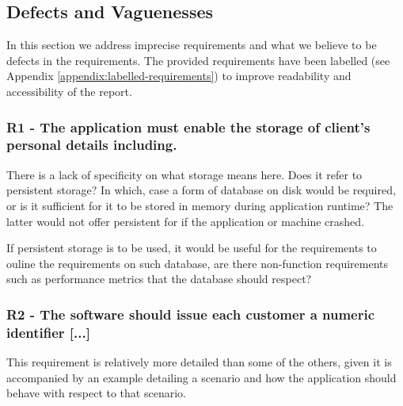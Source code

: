 \par


\subsection{Defects and Vaguenesses}

In this section we address imprecise requirements and what we believe to be defects in the requirements. The provided requirements have been labelled (see Appendix \ref{appendix:labelled-requirements}) to improve readability and accessibility of the report. 

\subsubsection{R1 - The application must enable the storage of client’s personal details including. }

There is a lack of specificity on what storage means here. Does it refer to persistent storage? In which, case a form of database on disk would be required, or is it sufficient for it to be stored in memory during application runtime? The latter would not offer persistent for if the application or machine crashed.  

If persistent storage is to be used, it would be useful for the requirements to ouline the requirements on such database, are there non-function requirements such as performance metrics that the database should respect? 

\subsubsection{R2 - The software should issue each customer a numeric identifier [...]} %

This requirement is relatively more detailed than some of the others, given it is accompanied by an example detailing a scenario and how the application should behave with respect to that scenario. 

